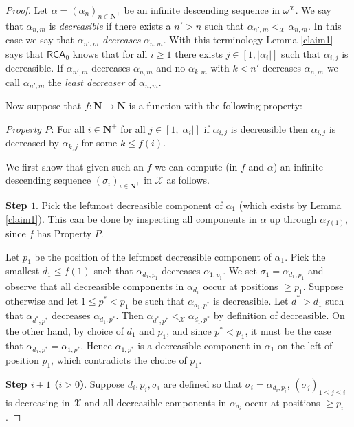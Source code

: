 \documentclass[10pt,a4paper]{amsart}
\newcommand\Nat{\mathbf{N}}
\newcommand\RCA{\mathsf{RCA}}
\newcommand\ordX{\mathcal{X}}
\begin{document}
\begin{proof}
Let $\alpha= (\alpha_n)_{n\in \Nat^+}$ be an infinite descending sequence in $\omega^\ordX$. 
We say that $\alpha_{n,m}$ is \emph{decreasible} if there exists a $n'>n$ such that $\alpha_{n',m} <_\ordX \alpha_{n,m}$. In this case we say that $\alpha_{n',m}$ \emph{decreases} $\alpha_{n,m}$. 
With this terminology Lemma \ref{claim1} says that $\RCA_0$ knows that for all $i\geq 1$ there exists $j \in [1, |\alpha_i|]$ such that $\alpha_{i,j}$ is decreasible. If $\alpha_{n',m}$ decreases $\alpha_{n,m}$ and no $\alpha_{k,m}$ 
with $k < n'$ decreases $\alpha_{n,m}$ we call $\alpha_{n',m}$ the \emph{least decreaser} of $\alpha_{n,m}$. 

Now suppose that $f:\Nat \to \Nat$ is a function with the following property:

\bigskip
{\em Property P}: For all $i\in \Nat^+$ for all $j \in [1, |\alpha_i|]$
if $\alpha_{i,j}$ is decreasible then $\alpha_{i,j}$ is decreased by $\alpha_{k,j}$ for some $k\leq f(i)$. 

\bigskip
We first show that given such an $f$ we can compute (in $f$ and $\alpha$) 
an infinite descending sequence $(\sigma_i)_{i\in\Nat^+}$ in $\mathcal{X}$ as follows. 

\bigskip
{\bf Step $1$}.  
Pick the leftmost decreasible component of $\alpha_1$ (which exists by Lemma \ref{claim1}). 
This can be done by inspecting all components 
in $\alpha$ up through $\alpha_{f(1)}$, since $f$ has Property $P$. 

Let $p_1$ be the position of the leftmost decreasible component of $\alpha_1$. 
Pick the smallest $d_1 \leq f(1)$ such that $\alpha_{d_1, p_1}$ decreases 
$\alpha_{1,p_1}$. 
We set $\sigma_1 = \alpha_{d_1, p_1}$ and observe that
all decreasible components in $\alpha_{d_1}$ occur at positions $\geq p_1$. 
Suppose otherwise and let $1\leq p^* < p_1$ be such that $\alpha_{d_1, p^*}$ is decreasible. 
Let $d^* > d_1$ such that $\alpha_{d^*, p^*}$ decreases $\alpha_{d_1,p^*}$. Then 
$\alpha_{d^*, p^*} <_{\ordX} \alpha_{d_1,p^*}$ by definition of decreasible. 
On the other hand, by choice of $d_1$ and $p_1$, and since
$p^* < p_1$, it must be the case that $\alpha_{d_1, p^*} = \alpha_{1, p^*}$. Hence $\alpha_{1, p^*}$ is a decreasible
component in $\alpha_1$ on the left of position $p_1$, which contradicts the choice of $p_1$. 

\bigskip
{\bf Step $i+1$ ($i > 0$)}. Suppose $d_i, p_i, \sigma_i$ are defined so that $\sigma_i = \alpha_{d_i, p_i}$, $(\sigma_j)_{1\leq j\leq i}$ is decreasing in $\mathcal{X}$ and all decreasible components in $\alpha_{d_i}$ occur at positions $\geq p_i$. 


\end{proof}
\end{document}
